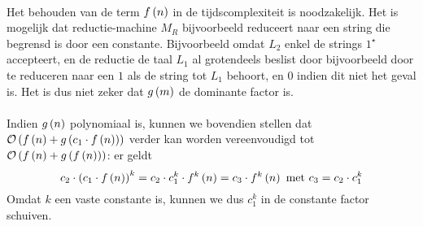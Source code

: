 \documentclass{article}
\begin{document}
\begin{question}[Complexiteitstheorie]
\begin{answer}
\begin{enumerate}
 \paragraph{}
 Het behouden van de term $f\left( n \right)$ in de tijdscomplexiteit is noodzakelijk. Het is mogelijk dat reductie-machine $M_R$
 bijvoorbeeld reduceert naar een string die begrensd is door een constante. Bijvoorbeeld omdat $L_2$ enkel de strings $1^{\star}$ accepteert,
 en de reductie de taal $L_1$ al grotendeels beslist door bijvoorbeeld door te reduceren naar een $1$ als de string tot $L_1$ behoort, en $0$
 indien dit niet het geval is. Het is dus niet zeker dat $g\left( m \right)$ de dominante factor is.
 
 \paragraph{}
 Indien $g\left( n \right)$ polynomiaal is, kunnen we bovendien stellen dat $\mathcal{O}\left( f\left( n \right)+g\left( c_1\cdot f\left( n \right) \right) \right)$ verder kan worden vereenvoudigd tot $\mathcal{O}\left( f\left( n \right)+g\left( f\left( n \right) \right) \right)$: er geldt
 \begin{equation}
  c_2\cdot\left( c_1\cdot f\left( n \right) \right)^{k}=c_2\cdot c_1^k\cdot f^k\left( n \right)=c_3\cdot f^k\left( n \right)\mbox{ met }c_3=c_2\cdot c_1^k
 \end{equation}
 Omdat $k$ een vaste constante is, kunnen we dus $c_1^k$ in de constante factor schuiven.
\end{enumerate}
\end{answer}
\end{question}
\end{document}
